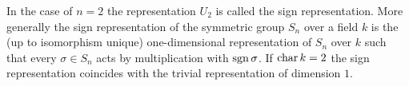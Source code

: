 \begin{rem}
  In the case of $n = 2$ the representation $U_2$ is called the sign representation. More generally the sign representation of the symmetric group $S_n$ over a field $k$ is the (up to isomorphism unique) one-dimensional representation of $S_n$ over $k$ such that every $\sigma \in S_n$ acts by multiplication with $\operatorname{sgn} \sigma$. If $\operatorname{char} k = 2$ the sign representation coincides with the trivial representation of dimension $1$.
\end{rem}




